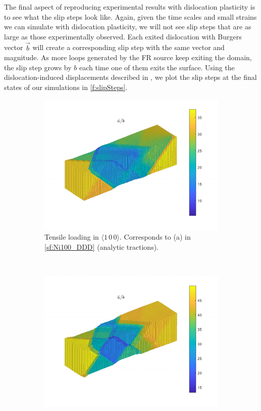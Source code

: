 The final aspect of reproducing experimental results with dislocation plasticity is to see what the slip steps look like. Again, given the time scales and small strains we can simulate with dislocation plasticity, we will not see slip steps that are as large as those experimentally observed. Each exited dislocation with Burgers vector $\vec{b}$ will create a corresponding slip step with the same vector and magnitude. As more loops generated by the FR source keep exiting the domain, the slip step grows by $b$ each time one of them exits the surface. Using the dislocation-induced displacements described in \cite{bromage2018calculating}, we plot the slip steps at the final states of our simulations in \cref{f:slipSteps}.
\begin{figure}
    \centering
    \begin{subfigure}[t]{0.45\linewidth}
        \centering
        \includegraphics[width=\linewidth]{../data/11-Mar-2021_8_tensile_ni_100_196800_disp.pdf}
        \caption{Tensile loading in $\langle 1\, 0\, 0 \rangle$. Corresponds to (a) in \cref{sf:Ni100_DDD} (analytic tractions).}
        \label{sf:Ni100a_disp}
    \end{subfigure}
    ~
    \begin{subfigure}[t]{0.45\linewidth}
        \centering
        \includegraphics[width=\linewidth]{../data/11-Mar-2021_numT_8_tensile_ni_100_168600_disp.pdf}

\end{subfigure}
\end{figure}
